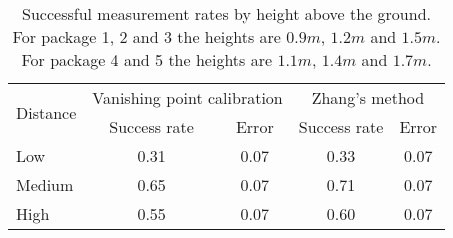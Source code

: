 \begin{table}
\centering
\begin{tabular}{@{} l *4c @{}}
\toprule
\multirow{2}{*}{Distance} & \multicolumn{2}{c}{Vanishing point calibration} & \multicolumn{2}{c}{Zhang's method}\\ 
\cmidrule(r){2-3}
\cmidrule(r){4-5}
& Success rate & Error & Success rate & Error \\
\midrule
 Low 		& 0.31 & 0.07 & 0.33 & 0.07 \\
 Medium 	& 0.65 & 0.07 & 0.71 & 0.07 \\
 High		& 0.55 & 0.07 & 0.60 & 0.07 \\

\bottomrule
 \end{tabular}
 \caption{Successful measurement rates by height above the ground. For package 1, 2 and 3 the heights are $0.9m$, $1.2m$ and $1.5m$. For package 4 and 5 the heights are $1.1m$, $1.4m$ and $1.7m$.} 
\label{table:key_measurement_by_height}
\end{table}